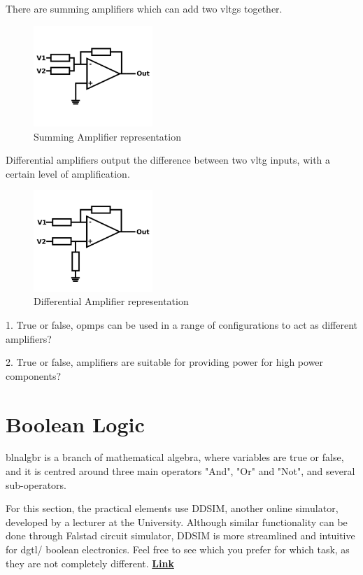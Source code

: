 \documentclass[a4paper,11pt]{report}
\newcommand{\Quiz}[1] %
{
\par\noindent %
\phantomsection %
\todo[inline, color=blue!30]{\textbf{#1}} %
\vspace{1em} %
}
\let\oldhref\href %
\renewcommand{\href}[2]{\oldhref{#1}{\bfseries#2}}
\begin{document}
There are summing amplifiers which can add two \gls{vltg}s together.

\begin{figure}[H]
\centering
\includegraphics[width=0.4\textwidth]{summingamp}
\caption{Summing Amplifier representation}
\end{figure}

Differential amplifiers output the difference between two \gls{vltg} inputs, with a certain level of amplification.

\begin{figure}[H]
\centering
\includegraphics[width=0.4\textwidth]{differentialamp}
\caption{Differential Amplifier representation}
\end{figure}

\Quiz{Quiz}

1. True or false, \gls{opmp}s can be used in a range of configurations to act as different amplifiers?

2. True or false, amplifiers are suitable for providing power for high power components?

\pagebreak

\section{Boolean Logic}

\gls{blnalgbr} is a branch of mathematical algebra, where variables are true or false, and it is centred around three main operators "And", "Or" and "Not", and several sub-operators.

For this section, the practical elements use DDSIM, another online simulator, developed by a lecturer at the University. Although similar functionality can be done through Falstad circuit simulator, DDSIM is more streamlined and intuitive for \gls{dgtl}/ boolean electronics. Feel free to see which you prefer for which task, as they are not completely different.
\href{https://www-users.york.ac.uk/~dajp1/Temp/ddsim.html}{Link}
\end{document}
